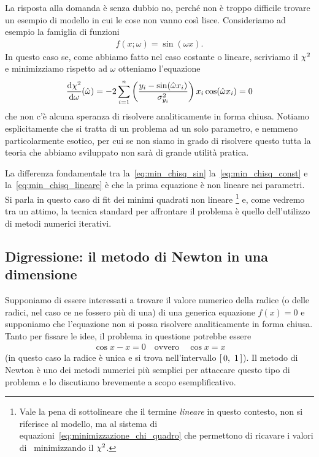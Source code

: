 La risposta alla domanda è senza dubbio no, perché non è troppo difficile
trovare un esempio di modello in cui le cose non vanno così lisce.
Consideriamo ad esempio la famiglia di funzioni
\begin{align}\label{eq:modello_seno}
  f(x; \omega) = \sin(\omega x).
\end{align}
In questo caso se, come abbiamo fatto nel caso costante o lineare, scriviamo il
$\chi^2$ e minimizziamo rispetto ad $\omega$ otteniamo l'equazione
\begin{align}\label{eq:min_chisq_sin}
  \td{\chisq}{\omega}{\hat{\omega}} =
  -2\sum_{i = 1}^n \left( \frac{y_i - \sin(\hat\omega x_i)}{\sigma^2_{y_i}} \right)
  x_i \cos(\hat\omega x_i) = 0
\end{align}
che non c'è alcuna speranza di risolvere analiticamente in forma chiusa.
Notiamo esplicitamente che si tratta di un problema ad un solo parametro, e
nemmeno particolarmente esotico, per cui se non siamo in grado di risolvere
questo tutta la teoria che abbiamo sviluppato non sarà di grande utilità
pratica.

La differenza fondamentale tra la~\eqref{eq:min_chisq_sin}
la~\eqref{eq:min_chisq_const} e la~\eqref{eq:min_chisq_lineare} è che
la prima equazione è non lineare nei parametri. Si parla in questo caso
di fit dei minimi quadrati non lineare%
\footnote{Vale la pena di sottolineare che il termine \emph{lineare} in questo
  contesto, non si riferisce al modello, ma al sistema di
  equazioni~\eqref{eq:minimizzazione_chi_quadro} che permettono di ricavare
  i valori di \bestfit\ minimizzando il $\chi^2$.}
e, come vedremo tra un attimo,
la tecnica standard per affrontare il problema è quello dell'utilizzo di
metodi numerici iterativi.


\subsection{Digressione: il metodo di Newton in una dimensione}

Supponiamo di essere interessati a trovare il valore numerico della radice
(o delle radici, nel caso ce ne fossero più di una) di una generica equazione
$f(x) = 0$ e supponiamo che l'equazione non si possa risolvere analiticamente
in forma chiusa. Tanto per fissare le idee, il problema in questione potrebbe
essere
\begin{align*}
  \cos x - x = 0 \quad \text{ovvero} \quad \cos x = x
\end{align*}
(in questo caso la radice è unica e si trova nell'intervallo
$\left[\, 0,~1 \,\right]$). Il metodo di Newton è uno dei metodi numerici più
semplici per attaccare questo tipo di problema e lo discutiamo brevemente a
scopo esemplificativo.

